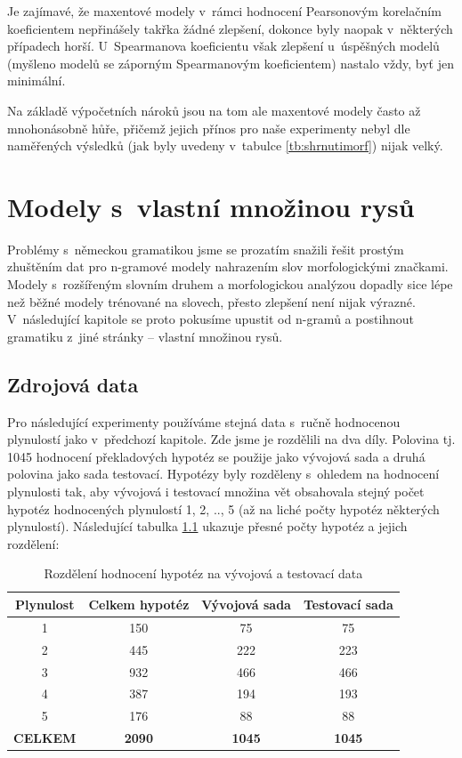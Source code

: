 \documentclass[12pt,a4paper]{report}
\begin{document}
Je zajímavé, že maxentové modely v~rámci hodnocení Pearsonovým korelačním koeficientem nepřinášely takřka žádné zlepšení, dokonce byly naopak v~některých případech horší. U~Spearmanova koeficientu však zlepšení u~úspěšných modelů (myšleno modelů se záporným Spearmanovým koeficientem) nastalo vždy, byť jen minimální.

Na základě výpočetních nároků jsou na tom ale maxentové modely často až mnohonásobně hůře, přičemž jejich přínos pro naše experimenty nebyl dle naměřených výsledků (jak byly uvedeny v~tabulce \ref{tb:shrnutimorf}) nijak velký.


\chapter{Modely s~vlastní množinou rysů}
Problémy s~německou gramatikou jsme se prozatím snažili řešit prostým zhuštěním dat pro n-gramové modely nahrazením slov morfologickými značkami. Modely s~rozšířeným slovním druhem a morfologickou analýzou dopadly sice lépe než běžné modely trénované na slovech, přesto zlepšení není nijak výrazné. V~následující kapitole se proto pokusíme upustit od n-gramů a postihnout gramatiku z~jiné stránky -- vlastní množinou rysů.

\section{Zdrojová data}

Pro následující experimenty používáme stejná data s~ručně hodnocenou plynulostí jako v~předchozí kapitole. Zde jsme je rozdělili na dva díly. Polovina tj. 1045 hodnocení překladových hypotéz se použije jako vývojová sada a druhá polovina jako sada testovací. Hypotézy byly rozděleny s~ohledem na hodnocení plynulosti tak, aby vývojová i testovací množina vět obsahovala stejný počet hypotéz hodnocených plynulostí 1, 2, .., 5 (až na liché počty hypotéz některých plynulostí). Následující tabulka \ref{tb:rozdeleni} ukazuje přesné počty hypotéz a jejich rozdělení:

\begin{table}[!htbp]
\begin{center}\begin{tabular}{|c|c|c|c|}
	\hline
	\textbf{Plynulost} & \textbf{Celkem hypotéz} & \textbf{Vývojová sada} & \textbf{Testovací sada}\\
	\hline
	1 & 150 & 75 & 75\\
	\hline
	2 & 445 & 222 & 223\\
	\hline
	3 & 932 & 466 & 466\\
	\hline
	4 & 387 & 194 & 193\\
	\hline
	5 & 176 & 88 & 88\\
	\hline
	\hline	
	\multicolumn{1}{c}{\textbf{CELKEM}} & \multicolumn{1}{c}{\textbf{2090}} & \multicolumn{1}{c}{\textbf{1045}} & \multicolumn{1}{c}{\textbf{1045}}\\
\end{tabular}
\caption{Rozdělení hodnocení hypotéz na vývojová a testovací data}\label{tb:rozdeleni}
\end{center}\end{table}
\end{document}
